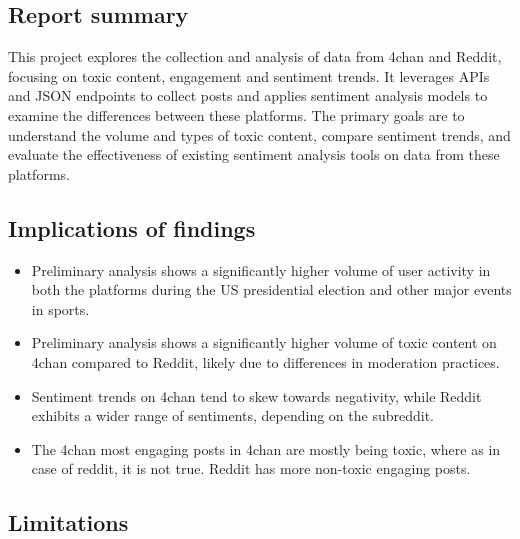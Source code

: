 \documentclass[sigconf]{acmart}
\begin{document}
\subsection{Report summary}
This project explores the collection and analysis of data from 4chan and Reddit, focusing on toxic content, engagement and sentiment trends. It leverages APIs and JSON endpoints to collect posts and applies sentiment analysis models to examine the differences between these platforms. The primary goals are to understand the volume and types of toxic content, compare sentiment trends, and evaluate the effectiveness of existing sentiment analysis tools on data from these platforms.

\subsection{Implications of findings}
\begin{itemize}
 
    \item Preliminary analysis shows a significantly higher volume of user activity in both the platforms during the US presidential election and other major events in sports.
    
    \item Preliminary analysis shows a significantly higher volume of toxic content on 4chan compared to Reddit, likely due to differences in moderation practices.
    
    \item Sentiment trends on 4chan tend to skew towards negativity, while Reddit exhibits a wider range of sentiments, depending on the subreddit.
    
    \item The 4chan most engaging posts in 4chan are mostly being toxic, where as in case of reddit, it is not true. Reddit has more  non-toxic engaging posts.
    

\end{itemize}

\subsection{Limitations}
\end{document}
